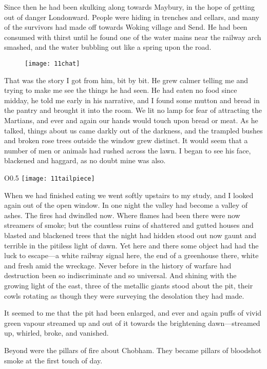 Since then he had been skulking along towards Maybury, in the hope of getting out of danger Londonward. People were hiding in trenches and cellars, and many of the survivors had made off towards Woking village and Send. He had been consumed with thirst until he found one of the water mains near the railway arch smashed, and the water bubbling out like a spring upon the road.

\begin{figure}[tb]
\centering
\texttt{[image: 11chat]}
\end{figure}

That was the story I got from him, bit by bit. He grew calmer telling me and trying to make me see the things he had seen. He had eaten no food since midday, he told me early in his narrative, and I found some mutton and bread in the pantry and brought it into the room. We lit no lamp for fear of attracting the Martians, and ever and again our hands would touch upon bread or meat. As he talked, things about us came darkly out of the darkness, and the trampled bushes and broken rose trees outside the window grew distinct. It would seem that a number of men or animals had rushed across the lawn. I began to see his face, blackened and haggard, as no doubt mine was also.

\begin{wrapfigure}{O}{0.5\textwidth}
\centering
\texttt{[image: 11tailpiece]}
\end{wrapfigure}

When we had finished eating we went softly upstairs to my study, and I looked again out of the open window. In one night the valley had become a valley of ashes. The fires had dwindled now. Where flames had been there were now streamers of smoke; but the countless ruins of shattered and gutted houses and blasted and blackened trees that the night had hidden stood out now gaunt and terrible in the pitiless light of dawn. Yet here and there some object had had the luck to escape—a white railway signal here, the end of a greenhouse there, white and fresh amid the wreckage. Never before in the history of warfare had destruction been so indiscriminate and so universal. And shining with the growing light of the east, three of the metallic giants stood about the pit, their cowls rotating as though they were surveying the desolation they had made.

It seemed to me that the pit had been enlarged, and ever and again puffs of vivid green vapour streamed up and out of it towards the brightening dawn—streamed up, whirled, broke, and vanished.

Beyond were the pillars of fire about Chobham. They became pillars of bloodshot smoke at the first touch of day.


